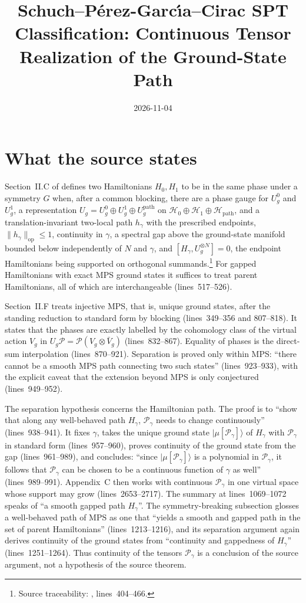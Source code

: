 \documentclass{article}
\title{Schuch--P\'erez-Garc{\'\i}a--Cirac SPT Classification: Continuous
    Tensor Realization of the Ground-State Path}
\author{}
\date{2026-11-04}
\begin{document}
\maketitle
{}

\section{What the source states}

Section~II.C of \cite{Schuch2011Phases} defines two Hamiltonians $H_0,H_1$ to
be in the same phase under a symmetry $G$ when, after a common blocking, there
are a phase gauge for $U^0_g$ and $U^1_g$, a representation
$U_g=U^0_g\oplus U^1_g\oplus U^{\mathrm{path}}_g$ on
$\mathcal H_0\oplus\mathcal H_1\oplus\mathcal H_{\mathrm{path}}$, and a
translation-invariant two-local path $h_\gamma$ with the prescribed endpoints,
$\|h_\gamma\|_{\mathrm{op}}\le1$, continuity in $\gamma$, a spectral gap above
the ground-state manifold bounded below independently of $N$ and $\gamma$, and
$[H_\gamma,U_g^{\otimes N}]=0$, the endpoint Hamiltonians being supported on
orthogonal summands.\footnote{Source traceability:
    , lines~404--466.}
For gapped Hamiltonians with exact MPS ground states it suffices to treat
parent Hamiltonians, all of which are interchangeable (lines~517--526).

Section~II.F treats injective MPS, that is, unique ground states, after the
standing reduction to standard form by blocking (lines~349--356 and
807--818). It states that the phases are exactly labelled by the cohomology
class of the virtual action $V_g$ in $U_g\mathcal P=\mathcal P(V_g\otimes\bar
V_g)$ (lines~832--867). Equality of phases is the direct-sum interpolation
(lines~870--921). Separation is proved only within MPS: ``there cannot be a
smooth MPS path connecting two such states'' (lines~923--933), with the
explicit caveat that the extension beyond MPS is only conjectured
(lines~949--952).

The separation hypothesis concerns the Hamiltonian path. The proof is to
``show that along any well-behaved path $H_\gamma$, $\mathcal P_\gamma$ needs
to change continuously'' (lines~938--941). It fixes $\gamma$, takes the unique
ground state $|\mu[\mathcal P_\gamma]\rangle$ of $H_\gamma$ with $\mathcal
P_\gamma$ in standard form (lines~957--960), proves continuity of the ground
state from the gap (lines~961--989), and concludes: ``since $|\mu[\mathcal
P_\gamma]\rangle$ is a polynomial in $\mathcal P_\gamma$, it follows that
$\mathcal P_\gamma$ can be chosen to be a continuous function of $\gamma$ as
well'' (lines~989--991). Appendix~C then works with continuous $\mathcal
P_\gamma$ in one virtual space whose support may grow (lines~2653--2717). The
summary at lines~1069--1072 speaks of ``a smooth gapped path $H_\gamma$''. The
symmetry-breaking subsection glosses a well-behaved path of MPS as one that
``yields a smooth and gapped path in the set of parent Hamiltonians''
(lines~1213--1216), and its separation argument again derives continuity of
the ground states from ``continuity and gappedness of $H_\gamma$''
(lines~1251--1264). Thus continuity of the tensors $\mathcal P_\gamma$ is a
conclusion of the source argument, not a hypothesis of the source theorem.
\end{document}
